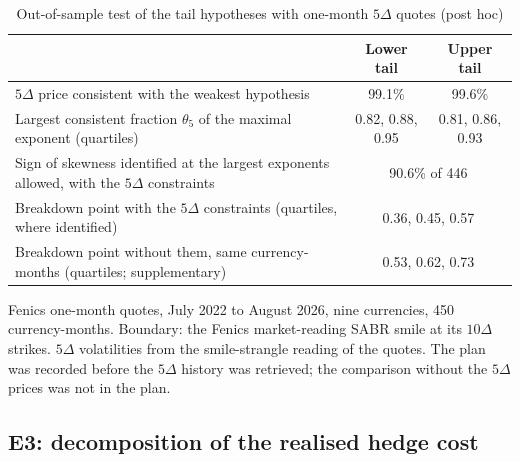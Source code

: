 \documentclass[11pt]{article}
\theoremstyle{result}
\newcommand{\D}{\Delta}
\begin{document}
\begin{table}[t]
\centering\small
\caption{Out-of-sample test of the tail hypotheses with one-month $5\D$ quotes (post hoc)}\label{tab:wing}
\begin{tabularx}{\linewidth}{@{}Xcc@{}}
\toprule
& Lower tail & Upper tail \\
\midrule
$5\D$ price consistent with the weakest hypothesis & 99.1\% & 99.6\% \\
Largest consistent fraction $\theta_5$ of the maximal exponent (quartiles) & 0.82, 0.88, 0.95 & 0.81, 0.86, 0.93 \\
\midrule
Sign of skewness identified at the largest exponents allowed, with the $5\D$ constraints & \multicolumn{2}{c}{90.6\% of 446} \\
Breakdown point with the $5\D$ constraints (quartiles, where identified) & \multicolumn{2}{c}{0.36, 0.45, 0.57} \\
Breakdown point without them, same currency-months (quartiles; supplementary) & \multicolumn{2}{c}{0.53, 0.62, 0.73} \\
\bottomrule
\end{tabularx}
\par\medskip
\begin{minipage}{0.95\linewidth}\footnotesize
Fenics one-month quotes, July 2022 to August 2026, nine currencies, 450 currency-months. Boundary: the Fenics market-reading SABR smile at its $10\D$ strikes. $5\D$ volatilities from the smile-strangle reading of the quotes. The plan was recorded before the $5\D$ history was retrieved; the comparison without the $5\D$ prices was not in the plan.
\end{minipage}
\end{table}

\subsection{E3: decomposition of the realised hedge cost}\label{sec:e3}
\end{document}
